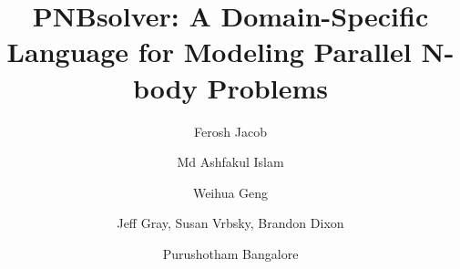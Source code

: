 \documentclass[draftclsnofoot]{elsarticle}
\begin{document}
\begin{frontmatter}
%
\title{PNBsolver: A Domain-Specific Language for Modeling Parallel N-body Problems
}




\author{Ferosh Jacob}
\address{Search and Personalization, The Home Depot}

\author{Md Ashfakul Islam}
\address{Department of Computer Science, University of Alabama}

\author{Weihua Geng}
\address{Department of Mathematics, Southern Methodist University}

\author{Jeff Gray, Susan Vrbsky, Brandon Dixon}
\address{Department of Computer Science, University of Alabama}

\author{Purushotham Bangalore}
\address{Computer and Information Sciences, University of Alabama at Birmingham}
%

% 





\end{frontmatter}
\end{document}

